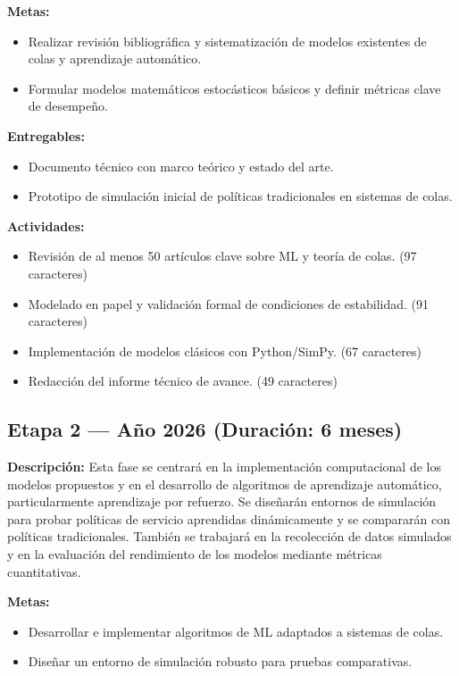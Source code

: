 \documentclass[12pt]{article}
\begin{document}
\textbf{Metas:}
\begin{itemize}
  \item Realizar revisión bibliográfica y sistematización de modelos existentes de colas y aprendizaje automático.
  \item Formular modelos matemáticos estocásticos básicos y definir métricas clave de desempeño.
\end{itemize}

\textbf{Entregables:}
\begin{itemize}
  \item Documento técnico con marco teórico y estado del arte.
  \item Prototipo de simulación inicial de políticas tradicionales en sistemas de colas.
\end{itemize}

\textbf{Actividades:}
\begin{itemize}
  \item Revisión de al menos 50 artículos clave sobre ML y teoría de colas. (97 caracteres)
  \item Modelado en papel y validación formal de condiciones de estabilidad. (91 caracteres)
  \item Implementación de modelos clásicos con Python/SimPy. (67 caracteres)
  \item Redacción del informe técnico de avance. (49 caracteres)
\end{itemize}

\subsection*{Etapa 2 — Año 2026 (Duración: 6 meses)}
\textbf{Descripción:} Esta fase se centrará en la implementación computacional de los modelos propuestos y en el desarrollo de algoritmos de aprendizaje automático, particularmente aprendizaje por refuerzo. Se diseñarán entornos de simulación para probar políticas de servicio aprendidas dinámicamente y se compararán con políticas tradicionales. También se trabajará en la recolección de datos simulados y en la evaluación del rendimiento de los modelos mediante métricas cuantitativas.

\textbf{Metas:}
\begin{itemize}
  \item Desarrollar e implementar algoritmos de ML adaptados a sistemas de colas.
  \item Diseñar un entorno de simulación robusto para pruebas comparativas.
\end{itemize}
\end{document}

